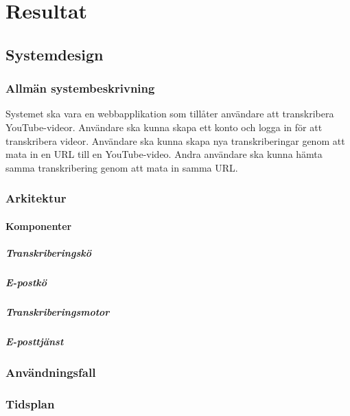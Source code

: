 \chapter{Resultat}

\section{Systemdesign}

\subsection{Allmän systembeskrivning}
Systemet ska vara en webbapplikation som tillåter användare att transkribera
YouTube-videor. Användare ska kunna skapa ett konto och logga in för att
transkribera videor. Användare ska kunna skapa nya transkriberingar genom att
mata in en URL till en YouTube-video. Andra användare ska kunna hämta samma
transkribering genom att mata in samma URL. 

\subsection{Arkitektur}

\subsubsection{Komponenter}

\paragraph{Transkriberingskö}

\paragraph{E-postkö}

\paragraph{Transkriberingsmotor}

\paragraph{E-posttjänst}

\subsection{Användningsfall}

\subsection{Tidsplan}

